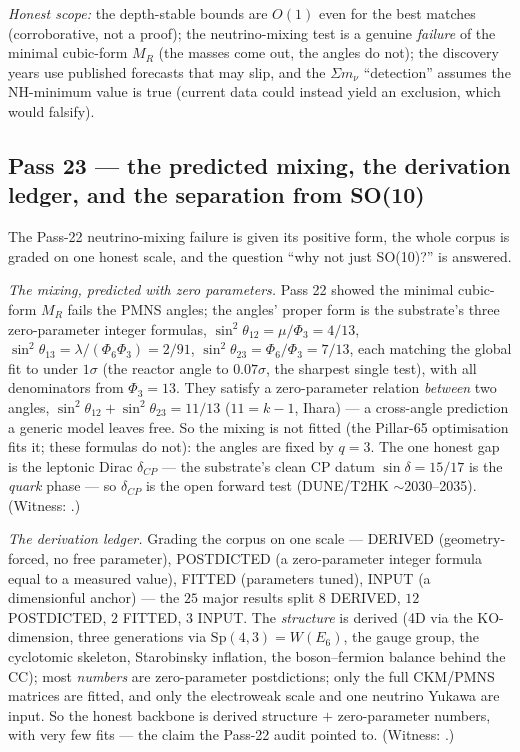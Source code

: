 \documentclass[11pt]{article}
\begin{document}
\emph{Honest scope:} the depth-stable bounds are $O(1)$ even for the best matches (corroborative,
not a proof); the neutrino-mixing test is a genuine \emph{failure} of the minimal cubic-form $M_R$
(the masses come out, the angles do not); the discovery years use published forecasts that may
slip, and the $\Sigma m_\nu$ ``detection'' assumes the NH-minimum value is true (current data
could instead yield an exclusion, which would falsify).

\subsection{Pass 23 --- the predicted mixing, the derivation ledger, and the separation from SO(10)}
\label{sec:capstone-twentythree}

The Pass-22 neutrino-mixing failure is given its positive form, the whole corpus is graded on one
honest scale, and the question ``why not just SO(10)?'' is answered.

\emph{The mixing, predicted with zero parameters.} Pass 22 showed the minimal cubic-form $M_R$
fails the PMNS angles; the angles' proper form is the substrate's three zero-parameter integer
formulas, $\sin^2\theta_{12}=\mu/\Phi_3=4/13$, $\sin^2\theta_{13}=\lambda/(\Phi_6\Phi_3)=2/91$,
$\sin^2\theta_{23}=\Phi_6/\Phi_3=7/13$, each matching the global fit to under $1\sigma$ (the
reactor angle to $0.07\sigma$, the sharpest single test), with all denominators from $\Phi_3=13$.
They satisfy a zero-parameter relation \emph{between} two angles, $\sin^2\theta_{12}+\sin^2
\theta_{23}=11/13$ ($11=k-1$, Ihara) --- a cross-angle prediction a generic model leaves free. So
the mixing is not fitted (the Pillar-65 optimisation fits it; these formulas do not): the angles
are fixed by $q=3$. The one honest gap is the leptonic Dirac $\delta_{CP}$ --- the substrate's
clean CP datum $\sin\delta=15/17$ is the \emph{quark} phase --- so $\delta_{CP}$ is the open
forward test (DUNE/T2HK $\sim$2030--2035). (Witness: .)

\emph{The derivation ledger.} Grading the corpus on one scale --- DERIVED (geometry-forced, no
free parameter), POSTDICTED (a zero-parameter integer formula equal to a measured value), FITTED
(parameters tuned), INPUT (a dimensionful anchor) --- the $25$ major results split $8$ DERIVED,
$12$ POSTDICTED, $2$ FITTED, $3$ INPUT. The \emph{structure} is derived (4D via the KO-dimension,
three generations via $\mathrm{Sp}(4,3)=W(E_6)$, the gauge group, the cyclotomic skeleton,
Starobinsky inflation, the boson--fermion balance behind the CC); most \emph{numbers} are
zero-parameter postdictions; only the full CKM/PMNS matrices are fitted, and only the electroweak
scale and one neutrino Yukawa are input. So the honest backbone is derived structure $+$
zero-parameter numbers, with very few fits --- the claim the Pass-22 audit pointed to. (Witness:
.)
\end{document}
